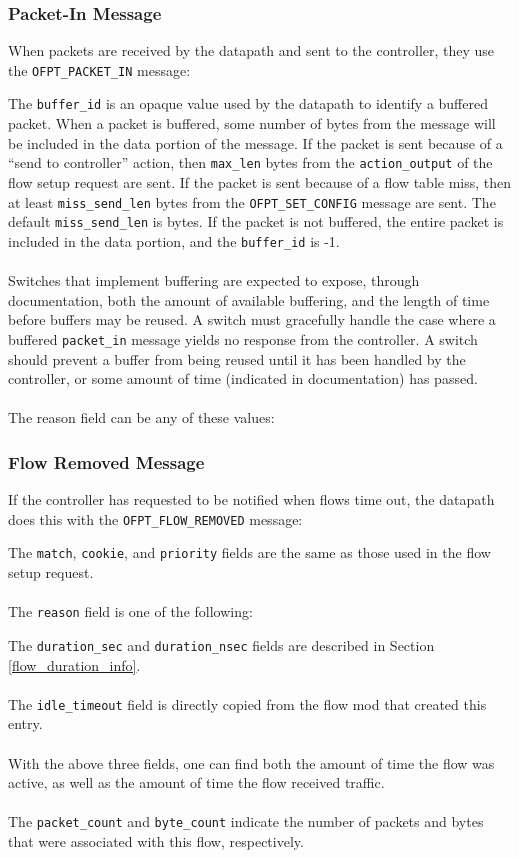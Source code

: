 \subsubsection{Packet-In Message}
When packets are received by the datapath and sent to the controller, they use the \verb|OFPT_PACKET_IN| message:


The \verb|buffer_id| is an opaque value used by the datapath to identify a buffered packet.  When a packet is buffered, some number of bytes from the message will be included in the data portion of the message.  If the packet is sent because of a ``send to controller'' action, then \verb|max_len| bytes from the \verb|action_output| of the flow setup request are sent.  If the packet is sent because of a flow table miss, then at least \verb|miss_send_len| bytes from the \verb|OFPT_SET_CONFIG| message are sent.  The default \verb|miss_send_len| is bytes.  If the packet is not buffered, the entire packet is included in the data portion, and the \verb|buffer_id| is -1.  
\\\\
Switches that implement buffering are expected to expose, through documentation, both the amount of available buffering, and the length of time before buffers may be reused.  A switch must gracefully handle the case where a buffered \verb|packet_in| message yields no response from the controller.  A switch should prevent a buffer from being reused until it has been handled by the controller, or some amount of time (indicated in documentation) has passed.
\\\\
The reason field can be any of these values:


 
\subsubsection{Flow Removed Message}
If the controller has requested to be notified when flows time out, the datapath does this with the \verb|OFPT_FLOW_REMOVED| message:


The \verb|match|, \verb|cookie|, and \verb|priority| fields are the same as those used in the flow setup request.
\\\\
The \verb|reason| field is one of the following:


The \verb|duration_sec| and \verb|duration_nsec| fields are described in Section \ref{flow_duration_info}.
\\\\
The \verb|idle_timeout| field is directly copied from the flow mod that created this entry. 
\\\\
With the above three fields, one can find both the amount of time the flow was active, as well as the amount of time the flow received traffic.
\\\\
The \verb|packet_count| and \verb|byte_count| indicate the number of packets and bytes that were associated with this flow, respectively. 
 
